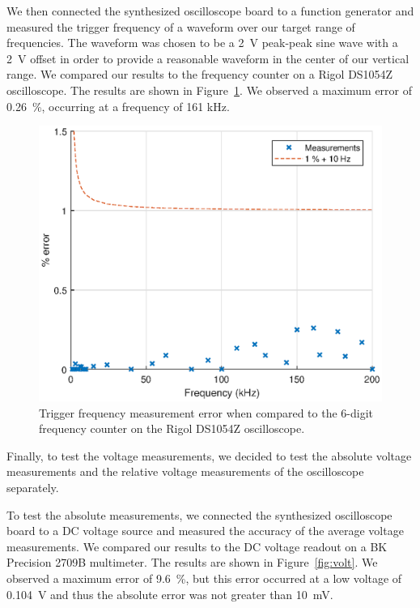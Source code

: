 \documentclass[journal,hidelinks]{IEEEtran}
\begin{document}
We then connected the synthesized oscilloscope board to a function generator and measured the trigger frequency of a waveform over our target range of frequencies. The waveform was chosen to be a 2~V peak-peak sine wave with a 2~V offset in order to provide a reasonable waveform in the center of our vertical range. We compared our results to the frequency counter on a Rigol DS1054Z oscilloscope. The results are shown in Figure~\ref{fig:freq}. We observed a maximum error of 0.26~\%, occurring at a frequency of 161 kHz.

\begin{figure}[!htb]
  \centering
  \includegraphics[width=\columnwidth]{test-results/freq.eps}
  \caption{Trigger frequency measurement error when compared to the 6-digit frequency counter on the Rigol DS1054Z oscilloscope.}
  \label{fig:freq}
\end{figure}

Finally, to test the voltage measurements, we decided to test the absolute voltage measurements and the relative voltage measurements of the oscilloscope separately.

To test the absolute measurements, we connected the synthesized oscilloscope board to a DC voltage source and measured the accuracy of the average voltage measurements. We compared our results to the DC voltage readout on a BK Precision 2709B multimeter. The results are shown in Figure~\ref{fig:volt}. We observed a maximum error of 9.6~\%, but this error occurred at a low voltage of 0.104~V and thus the absolute error was not greater than 10~mV.
\end{document}
